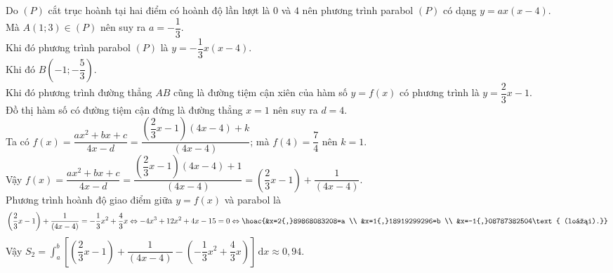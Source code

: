 \begin{bt}
{		Do $(P)$ cắt trục hoành tại hai điểm có hoành độ lần lượt là $0$ và $4$  nên phương trình parabol $(P)$ có dạng $y=a x(x-4)$.\\
		Mà $A(1; 3)\in(P)$ nên suy ra $a=-\dfrac{1}{3}$.\\ 
		Khi đó phương trình parabol  $(P)$ là $y=-\dfrac{1}{3} x(x-4)$. \\
		 Khi đó $B\left(-1;-\dfrac{5}{3}\right)$.\\
		Khi  đó phương trình đường thẳng $AB$ cũng là đường tiệm cận xiên của hàm số $y=f(x)$ có phương trình là $y=\dfrac{2}{3} x-1$.\\
		Đồ thị hàm số có đường tiệm cận đứng là  đường thẳng $x=1$ nên suy ra $d=4$.\\
		Ta có $f(x)=\dfrac{a x^2+b x+c}{4x-d}=\dfrac{\left(\dfrac{2}{3} x-1\right)(4x-4)+k}{(4x-4)}$; mà $f(4)=\dfrac{7}{4}$  nên $k=1$.\\
		Vậy $f(x)=\dfrac{a x^2+b x+c}{4x-d}=\dfrac{\left(\dfrac{2}{3} x-1\right)(4x-4)+1}{(4x-4)}=\left(\dfrac{2}{3}  x-1\right)+\dfrac{1}{(4x-4)}$.\\
		Phương trình hoành độ giao điểm giữa  $y=f(x)$ và parabol là \[\left(\dfrac{2}{3} x-1\right)+\dfrac{1}{(4x-4)}=-\dfrac{1}{3} x^2+\dfrac{4}{3} x \Leftrightarrow-4x^3+12x^2+4x-15=0\Leftrightarrow\hoac{&x=2{,}89868083208=a \\
		 &x=1{,}18919299296=b \\
		 &x=-1{,}08787382504\text{ (loại).}}
		\] 
		Vậy  $S_2=\displaystyle\int_a^b\left[\left(\dfrac{2}{3} x-1\right)+\dfrac{1}{(4x-4)}-\left(-\dfrac{1}{3} x^2+\dfrac{4}{3} x\right)\right] \mathrm{\,d}x \approx 0{,}94$.
	 }
\end{bt}

